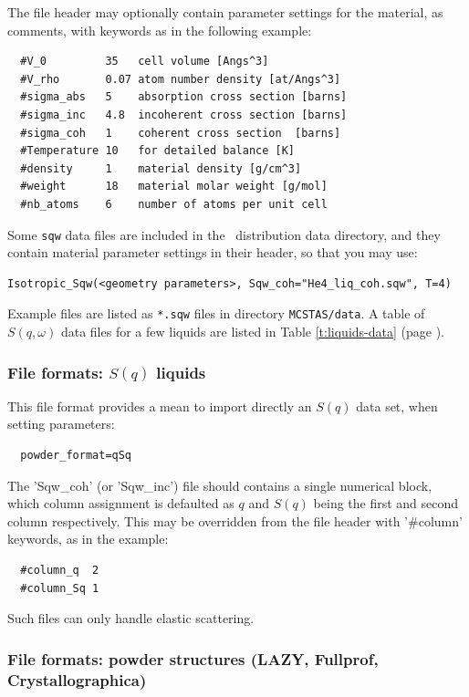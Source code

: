 The file header may optionally contain parameter settings for the material, as comments, with keywords as in the following example:
\begin{verbatim}
  #V_0         35   cell volume [Angs^3]
  #V_rho       0.07 atom number density [at/Angs^3]
  #sigma_abs   5    absorption cross section [barns]
  #sigma_inc   4.8  incoherent cross section [barns]
  #sigma_coh   1    coherent cross section  [barns]
  #Temperature 10   for detailed balance [K]
  #density     1    material density [g/cm^3]
  #weight      18   material molar weight [g/mol]
  #nb_atoms    6    number of atoms per unit cell
\end{verbatim}
Some \verb+sqw+ data files are included in the \MCS\ distribution data directory, and they contain material parameter settings in their header, so that you may use:
\begin{verbatim}
Isotropic_Sqw(<geometry parameters>, Sqw_coh="He4_liq_coh.sqw", T=4)
\end{verbatim}

Example files are listed as \verb+*.sqw+ files in directory \verb+MCSTAS/data+. A table of $S(q,\omega)$ data files for a few liquids are listed in Table \ref{t:liquids-data} (page \pageref{t:liquids-data}).

\subsubsection{File formats: $S(q)$ liquids}

This file format provides a mean to import directly an $S(q)$ data set, when setting parameters:
\begin{verbatim}
  powder_format=qSq
\end{verbatim}
The 'Sqw\_coh' (or 'Sqw\_inc') file should contains a single numerical block, which column assignment is defaulted as $q$ and $S(q)$ being the first and second column respectively. This may be overridden from the file header with '\#column' keywords, as in the example:
\begin{verbatim}
  #column_q  2
  #column_Sq 1
\end{verbatim}
Such files can only handle elastic scattering.

\subsubsection{File formats: powder structures (LAZY, Fullprof, Crystallographica)}

